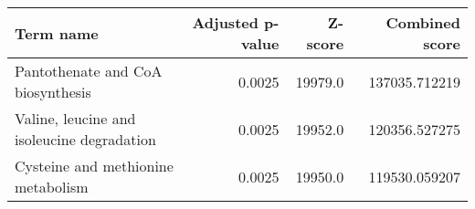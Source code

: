 \begin{tabular}{lrrr}
\toprule
                                 Term name &  Adjusted p-value &  Z-score &  Combined score \\
\midrule
         Pantothenate and CoA biosynthesis &            0.0025 &  19979.0 &   137035.712219 \\
Valine, leucine and isoleucine degradation &            0.0025 &  19952.0 &   120356.527275 \\
        Cysteine and methionine metabolism &            0.0025 &  19950.0 &   119530.059207 \\
\bottomrule
\end{tabular}
